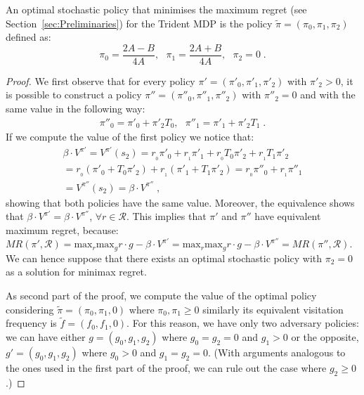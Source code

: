 \begin{proposition}\label{theorem:opt_stoc}
An optimal stochastic policy that minimises the maximum regret (see Section~\ref{sec:Preliminaries}) for the Trident MDP is the policy $\tilde{\pi} = (\pi_0, \pi_1, \pi_2)$ defined as:
$$\pi_{0}=\dfrac{2A - B}{4A},~~~\pi_{1}=\dfrac{2A + B}{4A}, ~~~\pi_2 = 0\;.$$
\end{proposition}
\begin{proof}
We first observe that for every policy $\pi' = (\pi'_0, \pi'_1, \pi'_2)$ with $\pi'_2 > 0$, it is possible to construct a policy $\pi'' = (\pi''_0, \pi''_1, \pi''_2)$ with $\pi''_2 = 0$ and with the same value in the following way:
\begin{align*}
\pi''_0 = \pi'_0 + \pi'_2 T_0, ~~~ \pi''_1 = \pi'_1 + \pi'_2 T_1\;.
\end{align*}
If we compute the value of the first policy we notice that:
\begin{align*}
\beta \cdot V^{\pi'} = V^{\pi'}(s_2) =
r_{_0} \pi'_0 + r_{_1}\pi'_1 + r_{_0} T_0 \pi'_2 + r_{_1} T_1 \pi'_2 \\
= r_{_0} (\pi'_0 + T_0 \pi'_2) + r_{_1} (\pi'_1 + T_1 \pi'_2)
= r_{_0} \pi''_0 + r_{_1}\pi''_1  \\
= V^{\pi''}(s_2) =\beta \cdot V^{\pi''}\;,
\end{align*}
showing that both policies have the same value.
Moreover, the equivalence shows that  $\beta \cdot V^{\pi'}= \beta \cdot V^{\pi''}$, $\forall r \in \mathcal{R}$. This implies that
$\pi'$ and $\pi''$ have equivalent maximum regret, because: $MR(\pi', \mathcal{R}) = \text{max}_{r} \text{max}_g r \cdot g - \beta \cdot V^{\pi'} = \text{max}_{r} \text{max}_g r \cdot g - \beta \cdot V^{\pi''} = MR(\pi'', \mathcal{R})$.
We can hence suppose that there exists an optimal stochastic policy with $\pi_2 =0$ as a solution for minimax regret. 

As second part of the proof, we compute the value of the optimal policy considering $\tilde{\pi} = (\pi_0, \pi_1, 0)$ where $\pi_0, \pi_1 \geq 0$ similarly its equivalent visitation frequency is $\tilde{f} = (f_0, f_1, 0)$. 
For this reason, we have only two adversary policies: we can have either $g = (g_0, g_1, g_2)$ where $g_0 = g_2=0$ and $g_1 > 0$ or the opposite, $g' = (g_0, g_1, g_2)$ where $g_0>0$ and $g_1 = g_2 = 0$. (With arguments analogous to the ones used in the first part of the proof, we can rule out the case where $g_2 \geq 0$.)


\end{proof}
